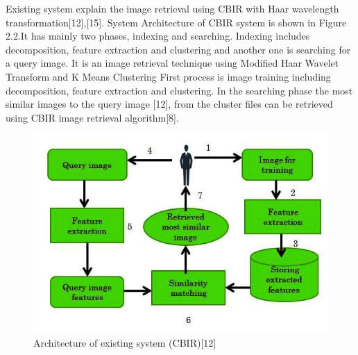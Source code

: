   \vspace*{1pc}
Existing system explain the image retrieval using CBIR with Haar wavelength transformation[12],[15]. System Architecture of CBIR system is shown in Figure 2.2.It has mainly two phases, indexing and searching. Indexing includes decomposition, feature extraction and clustering and another one is searching for a query image. It is an image retrieval technique using Modified Haar Wavelet Transform and K Means Clustering First process is image training including decomposition, feature extraction and clustering. In the searching phase the most similar images to the query image [12], from the cluster files can be retrieved using CBIR image retrieval algorithm[8].
 \clearpage 
 \vspace{1pc}
 \vspace{1pc}
\begin{figure}[ht]
\begin{minipage}[c]{1\linewidth}
\begin{center}
 \includegraphics[width=\textwidth]{e.jpg}
            \caption[Architecture of existing system]{Architecture of existing system (CBIR)[12]}
             \label{Invite friends}
\end{center}
\end{minipage}
\end{figure}
\noindent
\vspace{1pc}
